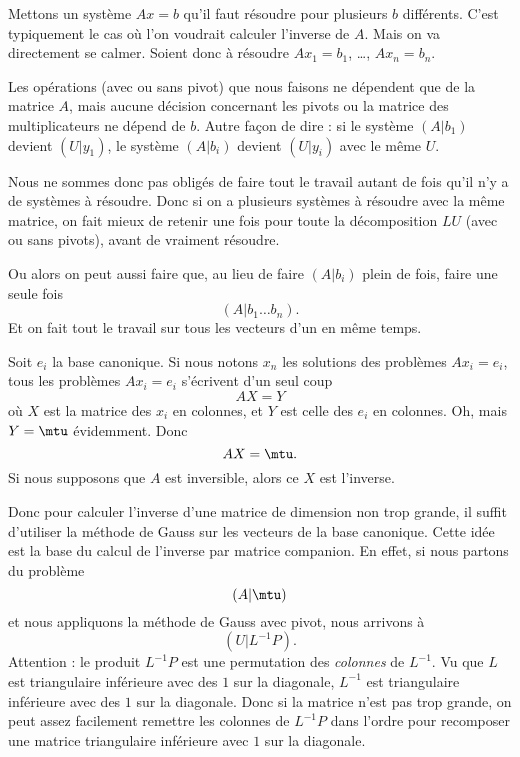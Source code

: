 Mettons un système \( Ax=b\) qu'il faut résoudre pour plusieurs \( b\) différents. C'est typiquement le cas où l'on voudrait calculer l'inverse de \( A\). Mais on va directement se calmer. Soient donc à résoudre \( Ax_1=b_1\), \ldots, \( Ax_n=b_n\).

Les opérations (avec ou sans pivot) que nous faisons ne dépendent que de la matrice \( A\), mais aucune décision concernant les pivots ou la matrice des multiplicateurs ne dépend de \( b\). Autre façon de dire : si le système \(  (A|b_1)  \) devient \( (U|y_1)\), le système \( (A|b_i)\) devient \( (U|y_i)\) avec le même \( U\).

Nous ne sommes donc pas obligés de faire tout le travail autant de fois qu'il n'y a de systèmes à résoudre. Donc si on a plusieurs systèmes à résoudre avec la même matrice, on fait mieux de retenir une fois pour toute la décomposition \( LU\) (avec ou sans pivots), avant de vraiment résoudre.

Ou alors on peut aussi faire que, au lieu de faire \( (A|b_i)\) plein de fois, faire une seule fois
\begin{equation}
	(A|b_1\ldots b_n).
\end{equation}
Et on fait tout le travail sur tous les vecteurs d'un en même temps.

Soit \( {e_i}\) la base canonique. Si nous notons \( x_n\) les solutions des problèmes \( Ax_i=e_i\), tous les problèmes \( Ax_i=e_i\) s'écrivent d'un seul coup
\begin{equation}
	AX=Y
\end{equation}
où \( X\) est la matrice des \( x_i\) en colonnes, et \( Y\) est celle des \( e_i\) en colonnes. Oh, mais \( Y=\mtu\) évidemment. Donc
\begin{equation}
	AX=\mtu.
\end{equation}
Si nous supposons que \( A\) est inversible, alors ce \( X\) est l'inverse.

Donc pour calculer l'inverse d'une matrice de dimension non trop grande, il suffit d'utiliser la méthode de Gauss sur les vecteurs de la base canonique. Cette idée est la base du calcul de l'inverse par matrice companion. En effet, si nous partons du problème
\begin{equation}
	(A|\mtu)
\end{equation}
et nous appliquons la méthode de Gauss avec pivot, nous arrivons à
\begin{equation}
	(U|L^{-1} P).
\end{equation}
Attention : le produit \( L^{-1}P\) est une permutation des \emph{colonnes} de \( L^{-1}\). Vu que \( L\) est triangulaire inférieure avec des \( 1\) sur la diagonale, \( L^{-1}\) est triangulaire inférieure avec des \( 1\) sur la diagonale. Donc si la matrice n'est pas trop grande, on peut assez facilement remettre les colonnes de \( L^{-1}P\) dans l'ordre pour recomposer une matrice triangulaire inférieure avec \( 1\) sur la diagonale.

